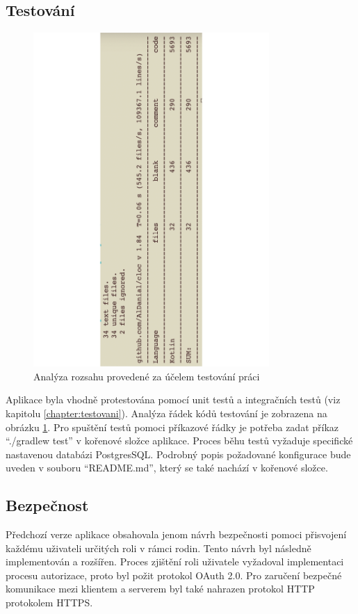     \subsection{Testování}
        \begin{figure}\centering
    	   \includegraphics[angle=-90, width=0.8\textwidth]{pdfs/CodeAmountTests2}
    	   \caption[Analýza kódu testů]{Analýza rozsahu provedené za účelem testování práci}\label{image:code-count-test}
        \end{figure}
        Aplikace byla vhodně protestována pomocí unit testů a integračních testů (viz kapitolu \ref{chapter:testovani}). Analýza řádek kódů testování je zobrazena na obrázku \ref{image:code-count-test}. Pro spuštění testů pomoci příkazové řádky je potřeba zadat příkaz \enquote{./gradlew test} v kořenové složce aplikace. Proces běhu testů vyžaduje specifické nastavenou databázi PostgresSQL.
        Podrobný popis požadované konfigurace bude uveden v souboru \enquote{README.md}, který se také nachází v kořenové složce.
    \subsection{Bezpečnost}
        Předchozí verze aplikace obsahovala jenom návrh bezpečnosti pomoci přisvojení každému uživateli určitých roli v rámci rodin. Tento návrh byl následně implementován a rozšířen. Proces zjištění roli uživatele vyžadoval implementaci procesu autorizace, proto byl požit protokol OAuth 2.0. Pro zaručení bezpečné komunikace mezi klientem a serverem byl také nahrazen protokol HTTP protokolem HTTPS.
        
